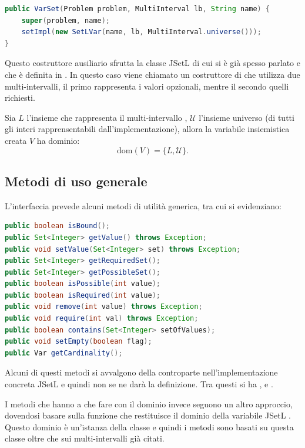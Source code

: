 \begin{lstlisting}[language = Java,
                   caption = {costruttore con un multi-intervallo.}]
public VarSet(Problem problem, MultiInterval lb, String name) {
	super(problem, name);
	setImpl(new SetLVar(name, lb, MultiInterval.universe()));
}
\end{lstlisting}
Questo costruttore ausiliario sfrutta la classe JSetL 
di cui si è già spesso parlato e che è definita in \cite{tesiAmadini}. 
In questo caso
viene chiamato un costruttore di  che utilizza due 
multi-intervalli, il primo rappresenta i valori opzionali, mentre
il secondo quelli richiesti.

Sia $L$ l'insieme che rappresenta il multi-intervallo , $\mathcal{U}$
l'insieme universo (di tutti gli interi rapprensentabili dall'implementazione),
allora la variabile insiemistica creata $V$ ha dominio:
\[
\textrm{dom}(V) = \{ L, \mathcal{U} \}.
\] 

\subsection{Metodi di uso generale}
L'interfaccia  prevede alcuni metodi di utilità generica, tra cui
si evidenziano:
\begin{lstlisting}[language = Java,frame = single]
public boolean isBound();
public Set<Integer> getValue() throws Exception;
public void setValue(Set<Integer> set) throws Exception;
public Set<Integer> getRequiredSet();
public Set<Integer> getPossibleSet();
public boolean isPossible(int value);
public boolean isRequired(int value);
public void remove(int value) throws Exception;
public void require(int val) throws Exception;
public boolean contains(Set<Integer> setOfValues);
public void setEmpty(boolean flag);
public Var getCardinality();
\end{lstlisting}
Alcuni di questi metodi si avvalgono della controparte nell'implementazione
concreta  JSetL e quindi non se ne darà la definizione. Tra questi
si ha ,  e .

I metodi che hanno a che fare con il dominio invece seguono un altro approccio,
dovendosi basare sulla funzione  che restituisce il
dominio della variabile JSetL . Questo dominio è
un'istanza della classe  e quindi i metodi sono basati su
questa classe oltre che sui multi-intervalli già citati.


